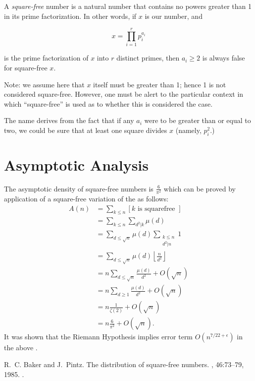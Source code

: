\documentclass{article}
\begin{document}

A \emph{square-free} number is a natural number that contains no powers greater than 1 in its prime factorization.  In other words, if $x$ is our number, and

$$ x = \prod_{i=1}^r p_i^{a_i} $$

is the prime factorization of $x$ into $r$ distinct primes, then $a_i \ge 2$ is
always false for square-free $x$.

Note: we assume here that $x$ itself must be greater than 1; hence 1 is not considered square-free.  However, one must be alert to the particular context in which ``square-free'' is used as to whether this is considered the case.

The name derives from the fact that if any $a_i$ were to be greater than or equal to two, we could be sure that at least one square divides $x$ (namely, $p_i^2$.)

\section{Asymptotic Analysis}

The asymptotic density of square-free numbers is $\frac{6}{\pi^2}$ which can be proved by application of a square-free variation of the  as follows:
\begin{align*}
A(n)&=\sum_{k\leq n} [k \text{ is squarefree }]\\
    &=\sum_{k\leq n} \sum_{d^2 | k} \mu(d)\\
    &=\sum_{d \leq \sqrt{n}} \mu(d) \sum_{\substack{k \leq n\\d^2 | n}} 1 \\
    &=\sum_{d \leq \sqrt{n}} \mu(d) \left\lfloor{\frac{n}{d^2}}\right\rfloor\\
    &=n \sum_{d \leq \sqrt{n}} \frac{\mu(d)}{d^2}+O(\sqrt{n})\\
    &=n \sum_{d\geq 1} \frac{\mu(d)}{d^2}+O(\sqrt{n})\\
    &=n \frac{1}{\zeta(2)} + O(\sqrt{n}) \\
    &=n \frac{6}{\pi^2}+O(\sqrt{n}).
\end{align*}
It was shown that the Riemann Hypothesis implies error term $O(n^{7/22+\epsilon})$ in the above \cite{cite:baker_pintz_sqfree}.

\begin{thebibliography}{1}

R.~C. Baker and J.~Pintz.
\newblock The distribution of square-free numbers.
, 46:73--79, 1985.
\newblock {}.

\end{thebibliography}
\end{document}
